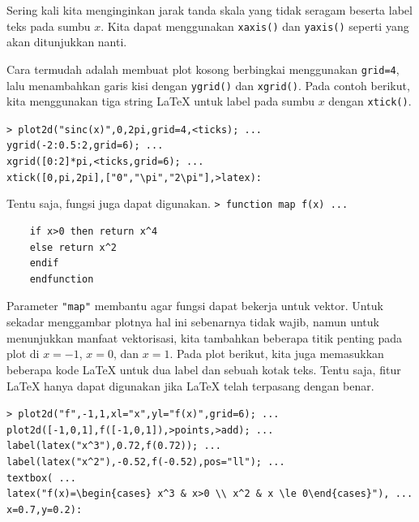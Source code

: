 \documentclass[11pt, a4paper]{article}
\newcommand{\emtcmd}[1]{\noindent\texttt{\textcolor{emtcommand}{>}\ #1}\par\smallskip}
\begin{document}
Sering kali kita menginginkan jarak tanda skala yang tidak seragam beserta label teks pada sumbu $x$. Kita dapat menggunakan \texttt{xaxis()} dan \texttt{yaxis()} seperti yang akan ditunjukkan nanti.

Cara termudah adalah membuat plot kosong berbingkai menggunakan \texttt{grid=4}, lalu menambahkan garis kisi dengan \texttt{ygrid()} dan \texttt{xgrid()}. Pada contoh berikut, kita menggunakan tiga string LaTeX untuk label pada sumbu $x$ dengan \texttt{xtick()}.

\emtcmd{plot2d("sinc(x)",0,2pi,grid=4,<ticks); ... \\
\hspace*{1em} ygrid(-2:0.5:2,grid=6); ... \\
\hspace*{1em} xgrid([0:2]*pi,<ticks,grid=6); ... \\
\hspace*{1em} xtick([0,pi,2pi],["0","\textbackslash pi","2\textbackslash pi"],>latex):}

Tentu saja, fungsi juga dapat digunakan.
\emtcmd{function map f(x) ...}
\begin{verbatim}
    if x>0 then return x^4
    else return x^2
    endif
    endfunction
\end{verbatim}

Parameter \texttt{"map"} membantu agar fungsi dapat bekerja untuk vektor. Untuk sekadar menggambar plotnya hal ini sebenarnya tidak wajib, namun untuk menunjukkan manfaat vektorisasi, kita tambahkan beberapa titik penting pada plot di $x=-1$, $x=0$, dan $x=1$. Pada plot berikut, kita juga memasukkan beberapa kode LaTeX untuk dua label dan sebuah kotak teks. Tentu saja, fitur LaTeX hanya dapat digunakan jika LaTeX telah terpasang dengan benar.

\emtcmd{plot2d("f",-1,1,xl="x",yl="f(x)",grid=6); ... \\
\hspace*{1em} plot2d([-1,0,1],f([-1,0,1]),>points,>add); ... \\
\hspace*{1em} label(latex("x\^{}3"),0.72,f(0.72)); ... \\
\hspace*{1em} label(latex("x\^{}2"),-0.52,f(-0.52),pos="ll"); ... \\
\hspace*{1em} textbox( ... \\
\hspace*{2em} latex("f(x)=\textbackslash begin\{cases\} x\^{}3 \& x>0 \textbackslash\textbackslash\ x\^{}2 \& x \textbackslash le 0\textbackslash end\{cases\}"), ... \\
\hspace*{2em} x=0.7,y=0.2):}
\end{document}
